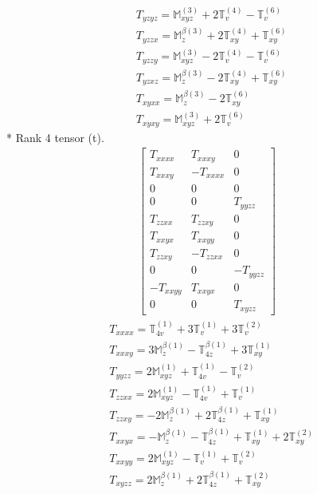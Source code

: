 \documentclass[fleqn,8pt,landscape]{jsarticle}
\begin{document}
\begin{align*}
& T_{yzyz} = \mathbb{M}_{xyz}^{(3)} + 2 \mathbb{T}_{v}^{(4)} - \mathbb{T}_{v}^{(6)} \\
& T_{yzzx} = \mathbb{M}_{z}^{\beta(3)} + 2 \mathbb{T}_{xy}^{(4)} + \mathbb{T}_{xy}^{(6)} \\
& T_{yzzy} = \mathbb{M}_{xyz}^{(3)} - 2 \mathbb{T}_{v}^{(4)} - \mathbb{T}_{v}^{(6)} \\
& T_{yzxz} = \mathbb{M}_{z}^{\beta(3)} - 2 \mathbb{T}_{xy}^{(4)} + \mathbb{T}_{xy}^{(6)} \\
& T_{xyxx} = \mathbb{M}_{z}^{\beta(3)} - 2 \mathbb{T}_{xy}^{(6)} \\
& T_{xyxy} = \mathbb{M}_{xyz}^{(3)} + 2 \mathbb{T}_{v}^{(6)}
\end{align*}
* Rank 4 tensor (t).
\begin{align*}
\begin{bmatrix} T_{xxxx} & T_{xxxy} & 0 \\ T_{xxxy} & - T_{xxxx} & 0 \\ 0 & 0 & 0 \\ 0 & 0 & T_{yyzz} \\ T_{zzxx} & T_{zzxy} & 0 \\ T_{xxyx} & T_{xxyy} & 0 \\ T_{zzxy} & - T_{zzxx} & 0 \\ 0 & 0 & - T_{yyzz} \\ - T_{xxyy} & T_{xxyx} & 0 \\ 0 & 0 & T_{xyzz} \end{bmatrix}
\end{align*}
\begin{align*}
& T_{xxxx} = \mathbb{T}_{4v}^{(1)} + 3 \mathbb{T}_{v}^{(1)} + 3 \mathbb{T}_{v}^{(2)} \\
& T_{xxxy} = 3 \mathbb{M}_{z}^{\beta(1)} - \mathbb{T}_{4z}^{\beta(1)} + 3 \mathbb{T}_{xy}^{(1)} \\
& T_{yyzz} = 2 \mathbb{M}_{xyz}^{(1)} + \mathbb{T}_{4v}^{(1)} - \mathbb{T}_{v}^{(2)} \\
& T_{zzxx} = 2 \mathbb{M}_{xyz}^{(1)} - \mathbb{T}_{4v}^{(1)} + \mathbb{T}_{v}^{(1)} \\
& T_{zzxy} = - 2 \mathbb{M}_{z}^{\beta(1)} + 2 \mathbb{T}_{4z}^{\beta(1)} + \mathbb{T}_{xy}^{(1)} \\
& T_{xxyx} = - \mathbb{M}_{z}^{\beta(1)} - \mathbb{T}_{4z}^{\beta(1)} + \mathbb{T}_{xy}^{(1)} + 2 \mathbb{T}_{xy}^{(2)} \\
& T_{xxyy} = 2 \mathbb{M}_{xyz}^{(1)} - \mathbb{T}_{v}^{(1)} + \mathbb{T}_{v}^{(2)} \\
& T_{xyzz} = 2 \mathbb{M}_{z}^{\beta(1)} + 2 \mathbb{T}_{4z}^{\beta(1)} + \mathbb{T}_{xy}^{(2)}
\end{align*}
\end{document}
